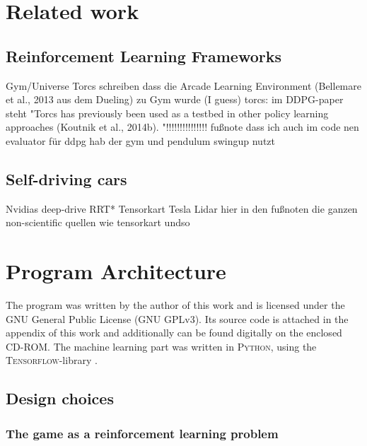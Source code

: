 
\chapter{Related work}

\section{Reinforcement Learning Frameworks}

Gym/Universe
Torcs
schreiben dass die Arcade Learning Environment (Bellemare et al., 2013 aus dem Dueling) zu Gym wurde (I guess)
torcs: im DDPG-paper steht "Torcs has previously been used as a testbed in other
policy learning approaches (Koutnik et al., 2014b). "!!!!!!!!!!!!!!!
fußnote dass ich auch im code nen evaluator für ddpg hab der gym und pendulum swingup nutzt

\section{Self-driving cars}

Nvidias deep-drive
RRT*
Tensorkart
Tesla
Lidar
hier in den fußnoten die ganzen non-scientific quellen wie tensorkart undso

\chapter{Program Architecture}


The program was written by the author of this work and is licensed under the GNU General Public License (GNU GPLv3). Its source code is attached in the appendix of this work and additionally can be found digitally on the enclosed CD-ROM. The machine learning part was written in \textsc{Python}, using the \textsc{Tensorflow}-library \parencite{abadi_tensorflow:_2015}.

\section{Design choices}

\subsection{The game as a reinforcement learning problem}

